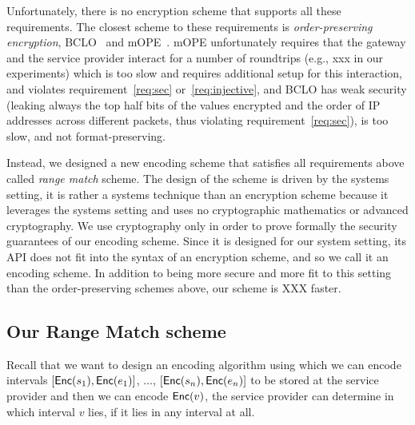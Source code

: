  

Unfortunately, there is no encryption scheme that supports all these requirements. The closest scheme to these requirements  is {\em order-preserving encryption}, BCLO~\cite{boldyreva:ope} and mOPE~\cite{popa:mope}. mOPE unfortunately requires that the gateway and the service provider interact for a number of roundtrips (e.g., xxx in our experiments) which is too slow and requires additional setup for this interaction, and violates requirement~\ref{req:sec} or~\ref{req:injective}, and BCLO has weak security (leaking always the top half bits of the values encrypted and the order of IP addresses across different packets, thus violating requirement~\ref{req:sec}), is too slow, and not format-preserving. 

Instead, we designed a new encoding scheme that satisfies all requirements above called {\em range match} scheme. 
The design of the scheme is driven by the systems setting, it is rather a systems technique than an encryption scheme because it leverages the systems setting and uses no cryptographic mathematics or advanced cryptography.  We use cryptography only in order to prove formally the security guarantees of our encoding scheme. Since it is designed for our system setting, its API does not fit into the syntax of an encryption scheme, and so we call it an encoding scheme. 
In addition to being more secure and more fit to this setting than the order-preserving schemes above, our scheme is XXX faster.



\subsection{Our Range Match scheme} 


Recall that we want to design an encoding algorithm using which we can encode intervals  $[\mathsf{Enc}(s_1), \mathsf{Enc}(e_1)]$, $\dots$, $[\mathsf{Enc}(s_n), \mathsf{Enc}(e_n)]$ to be stored at the service provider and then we can encode  $\mathsf{Enc}(v)$, the service provider can determine in which interval $v$ lies, if it lies in any interval at all. 

